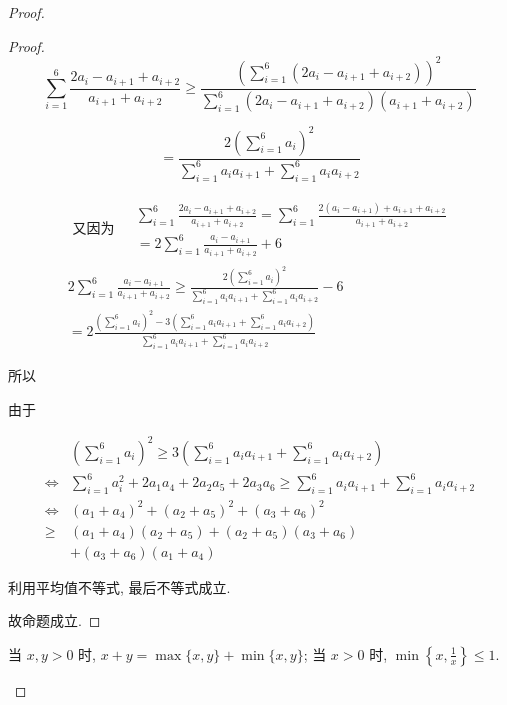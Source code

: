 \begin{proof}
\begin{example}
\begin{solution}
\begin{note}
\begin{solution}
\begin{proof}
	$$
	\sum_{i=1}^{6} \frac{2 a_{i}-a_{i+1}+a_{i+2}}{a_{i+1}+a_{i+2}} \geqslant \frac{\left(\sum_{i=1}^{6}\left(2 a_{i}-a_{i+1}+a_{i+2}\right)\right)^{2}}{\sum_{i=1}^{6}\left(2 a_{i}-a_{i+1}+a_{i+2}\right)\left(a_{i+1}+a_{i+2}\right)}
	$$
	
	$$
	=\frac{2\left(\sum_{i=1}^{6} a_{i}\right)^{2}}{\sum_{i=1}^{6} a_{i} a_{i+1}+\sum_{i=1}^{6} a_{i} a_{i+2}}
	$$
	
	$$
	\begin{gathered}
	\text { 又因为 } \begin{aligned}
	& \sum_{i=1}^{6} \frac{2 a_{i}-a_{i+1}+a_{i+2}}{a_{i+1}+a_{i+2}}=\sum_{i=1}^{6} \frac{2\left(a_{i}-a_{i+1}\right)+a_{i+1}+a_{i+2}}{a_{i+1}+a_{i+2}} \\
	&=2 \sum_{i=1}^{6} \frac{a_{i}-a_{i+1}}{a_{i+1}+a_{i+2}}+6
	\end{aligned} \\
	2 \sum_{i=1}^{6} \frac{a_{i}-a_{i+1}}{a_{i+1}+a_{i+2}} \geqslant \frac{2\left(\sum_{i=1}^{6} a_{i}\right)^{2}}{\sum_{i=1}^{6} a_{i} a_{i+1}+\sum_{i=1}^{6} a_{i} a_{i+2}}-6 \\
	=2 \frac{\left(\sum_{i=1}^{6} a_{i}\right)^{2}-3\left(\sum_{i=1}^{6} a_{i} a_{i+1}+\sum_{i=1}^{6} a_{i} a_{i+2}\right)}{\sum_{i=1}^{6} a_{i} a_{i+1}+\sum_{i=1}^{6} a_{i} a_{i+2}}
	\end{gathered}
	$$
	
	所以
	
	由于
	
	$$
	\begin{aligned}
	& \left(\sum_{i=1}^{6} a_{i}\right)^{2} \geqslant 3\left(\sum_{i=1}^{6} a_{i} a_{i+1}+\sum_{i=1}^{6} a_{i} a_{i+2}\right) \\
	\Leftrightarrow & \sum_{i=1}^{6} a_{i}^{2}+2 a_{1} a_{4}+2 a_{2} a_{5}+2 a_{3} a_{6} \geqslant \sum_{i=1}^{6} a_{i} a_{i+1}+\sum_{i=1}^{6} a_{i} a_{i+2} \\
	\Leftrightarrow & \left(a_{1}+a_{4}\right)^{2}+\left(a_{2}+a_{5}\right)^{2}+\left(a_{3}+a_{6}\right)^{2} \\
	\geqslant & \left(a_{1}+a_{4}\right)\left(a_{2}+a_{5}\right)+\left(a_{2}+a_{5}\right)\left(a_{3}+a_{6}\right) \\
	& +\left(a_{3}+a_{6}\right)\left(a_{1}+a_{4}\right)
	\end{aligned}
	$$
	
	利用平均值不等式, 最后不等式成立.
	
	故命题成立.
\end{proof}
\begin{note}
	当 $x, y>0$ 时, $x+y=\max \{x, y\}+\min \{x, y\}$; 当 $x>0$ 时, $\min \left\{x, \frac{1}{x}\right\} \leqslant 1$.
\end{note}


\end{solution}
\end{note}
\end{solution}
\end{example}
\end{proof}
